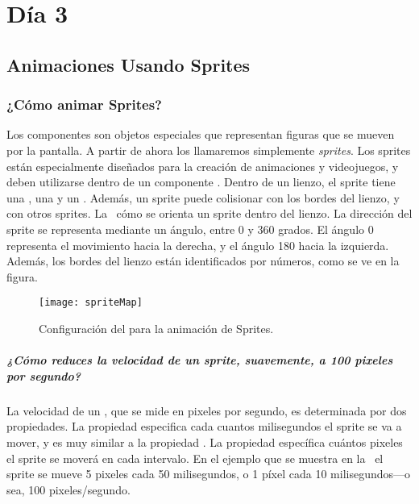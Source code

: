 \chapter{Día 3}

\section{Animaciones Usando Sprites}

\subsection*{¿Cómo animar Sprites?}

Los componentes  son objetos especiales que
representan figuras que se mueven por la pantalla. A partir de ahora
los llamaremos simplemente \emph{sprites}. Los sprites están
especialmente diseñados para la creación de animaciones y videojuegos,
y deben utilizarse dentro de un componente . Dentro
de un lienzo, el sprite tiene una , una
 y un . Además, un sprite puede
colisionar con los bordes del lienzo, y con otros
sprites. La~ cómo se orienta un sprite dentro del
lienzo. La dirección del sprite se representa mediante un ángulo,
entre 0 y 360 grados. El ángulo 0 representa el movimiento hacia la
derecha, y el ángulo 180 hacia la izquierda. Además, los bordes del
lienzo están identificados por números, como se ve en la figura.

\begin{figure}[H]
\centering
\texttt{[image: spriteMap]}
\caption{Configuración del  para la animación de Sprites.}
\label{fig:spriteMap}
\end{figure}

\paragraph{¿Cómo reduces la velocidad de un sprite, suavemente, a 100
  pixeles por segundo?}

La velocidad de un , que se mide en pixeles
por segundo, es determinada por dos propiedades. La propiedad
 especifica cada cuantos milisegundos el sprite se
va a mover, y es muy similar a la propiedad
. La propiedad
 específica cuántos pixeles el sprite se moverá en
cada intervalo. En el ejemplo que se muestra en la~
el sprite se mueve 5 pixeles cada 50 milisegundos, o 1 píxel cada 10
milisegundos---o sea, 100 pixeles/segundo.

